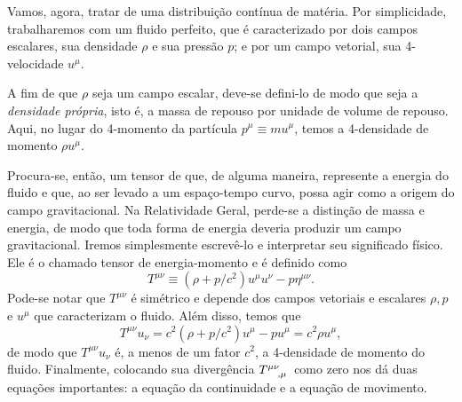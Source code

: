 Vamos, agora, tratar de uma distribuição contínua de matéria. Por simplicidade, trabalharemos com um fluido perfeito, que é caracterizado por dois campos escalares, sua densidade $\rho$ e sua pressão $p$; e por um campo vetorial, sua 4-velocidade $u^{\mu}$. 

A fim de que $\rho$ seja um campo escalar, deve-se defini-lo de modo que seja a \textit{densidade própria}, isto é, a massa de repouso por unidade de volume de repouso. Aqui, no lugar do 4-momento da partícula $p^\mu\equiv mu^\mu$, temos a 4-densidade de momento $\rho u^\mu$.

Procura-se, então, um tensor de que, de alguma maneira, represente a energia do fluido e que, ao ser levado a um espaço-tempo curvo, possa agir como a origem do campo gravitacional. Na Relatividade Geral, perde-se a distinção de massa e energia, de modo que toda forma de energia deveria produzir um campo gravitacional. Iremos simplesmente escrevê-lo e interpretar seu significado físico. Ele é o chamado tensor de energia-momento e é definido como
\begin{equation}\label{eq:TensorEnergiaMomentoDefinicao}
	T^{\mu \nu} \equiv\left(\rho+p / c^{2}\right) u^{\mu} u^{\nu}-p \eta^{\mu \nu}.
\end{equation}
Pode-se notar que $T^{\mu \nu}$ é simétrico e depende dos campos vetoriais e escalares $\rho, p$ e $u^\mu$ que caracterizam o fluido. Além disso, temos que
\[
	T^{\mu \nu} u_{\nu}=c^{2}\left(\rho+p / c^{2}\right) u^{\mu}-p u^{\mu}=c^{2} \rho u^{\mu},	
\]
de modo que $T^{\mu \nu}{u_{\nu}}$ é, a menos de um fator $c^2$, a 4-densidade de momento do fluido. Finalmente, colocando sua divergência $\tensor{T}{^{\mu\nu}_{,\mu}}$ como zero nos dá duas equações importantes: a equação da continuidade e a equação de movimento. 

